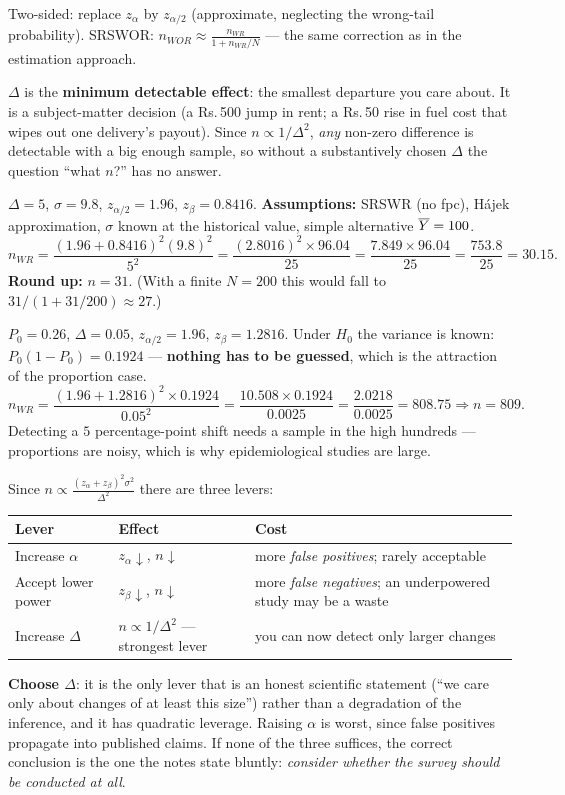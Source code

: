  Two-sided: replace $z_\alpha$ by $z_{\alpha/2}$ (approximate, neglecting the wrong-tail
probability). SRSWOR: $n_{WOR}\approx\frac{n_{WR}}{1+n_{WR}/N}$ --- the same correction as in the
estimation approach.

 $\Delta$ is the \textbf{minimum detectable effect}: the smallest departure you care about.
It is a subject-matter decision (a Rs.\,500 jump in rent; a Rs.\,50 rise in fuel cost that wipes
out one delivery's payout). Since $n\propto1/\Delta^2$, \emph{any} non-zero difference is
detectable with a big enough sample, so without a substantively chosen $\Delta$ the question
``what $n$?'' has no answer.

\sol $\Delta=5$, $\sigma=9.8$, $z_{\alpha/2}=1.96$, $z_\beta=0.8416$.
\textbf{Assumptions:} SRSWR (no fpc), H\'ajek approximation, $\sigma$ known at the historical
value, simple alternative $\overline{Y}=100$.
\[
  n_{WR}=\frac{(1.96+0.8416)^2(9.8)^2}{5^2}=\frac{(2.8016)^2\times96.04}{25}
  =\frac{7.849\times96.04}{25}=\frac{753.8}{25}=30.15 .
\]
\textbf{Round up:} $\boxed{n=31}$. (With a finite $N=200$ this would fall to
$31/(1+31/200)\approx27$.)

\sol $P_0=0.26$, $\Delta=0.05$, $z_{\alpha/2}=1.96$, $z_\beta=1.2816$. Under $H_0$ the variance
is known: $P_0(1-P_0)=0.1924$ --- \textbf{nothing has to be guessed}, which is the attraction of
the proportion case.
\[
  n_{WR}=\frac{(1.96+1.2816)^2\times0.1924}{0.05^2}=\frac{10.508\times0.1924}{0.0025}
  =\frac{2.0218}{0.0025}=808.75\Longrightarrow\boxed{n=809}.
\]
Detecting a $5$ percentage-point shift needs a sample in the high hundreds --- proportions are
noisy, which is why epidemiological studies are large.

\sol Since $n\propto\frac{(z_\alpha+z_\beta)^2\sigma^2}{\Delta^2}$ there are three levers:
\begin{center}
\begin{tabular}{@{}p{3.6cm}p{3.6cm}p{6.4cm}@{}}
\toprule Lever & Effect & Cost \\ \midrule
Increase $\alpha$ & $z_\alpha\downarrow$, $n\downarrow$ & more \emph{false positives}; rarely acceptable \\
Accept lower power & $z_\beta\downarrow$, $n\downarrow$ & more \emph{false negatives}; an underpowered study may be a waste \\
Increase $\Delta$ & $n\propto1/\Delta^2$ --- strongest lever & you can now detect only larger changes \\
\bottomrule\end{tabular}
\end{center}
\textbf{Choose $\Delta$}: it is the only lever that is an honest scientific statement (``we care
only about changes of at least this size'') rather than a degradation of the inference, and it has
quadratic leverage. Raising $\alpha$ is worst, since false positives propagate into published
claims. If none of the three suffices, the correct conclusion is the one the notes state bluntly:
\emph{consider whether the survey should be conducted at all}.

